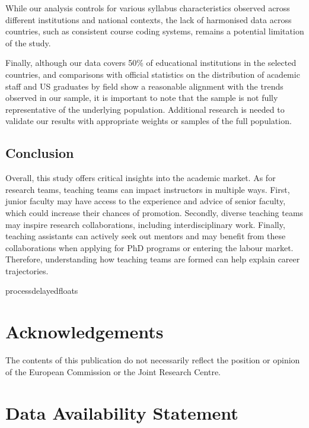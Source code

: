\documentclass[
  british,
  12pt,
]{article}
\begin{document}
While our analysis controls for various syllabus characteristics observed across different institutions and national contexts, the lack of harmonised data across countries, such as consistent course coding systems, remains a potential limitation of the study.

Finally, although our data covers 50\% of educational institutions in the selected countries, and comparisons with official statistics on the distribution of academic staff and US graduates by field show a reasonable alignment with the trends observed in our sample, it is important to note that the sample is not fully representative of the underlying population. Additional research is needed to validate our results with appropriate weights or samples of the full population.

\subsection{Conclusion}\label{conclusion}

Overall, this study offers critical insights into the academic market. As for research teams, teaching teams can impact instructors in multiple ways. First, junior faculty may have access to the experience and advice of senior faculty, which could increase their chances of promotion. Secondly, diverse teaching teams may inspire research collaborations, including interdisciplinary work. Finally, teaching assistants can actively seek out mentors and may benefit from these collaborations when applying for PhD programs or entering the labour market. Therefore, understanding how teaching teams are formed can help explain career trajectories.

\clearpage

\ifcsname processdelayedfloats\endcsname
\processdelayedfloats
\fi
\clearpage

\section*{Acknowledgements}\label{acknowledgements}

The contents of this publication do not necessarily reflect the position or opinion of the European Commission or the Joint Research Centre.

\section*{Data Availability Statement}\label{data-availability-statement}
\end{document}

